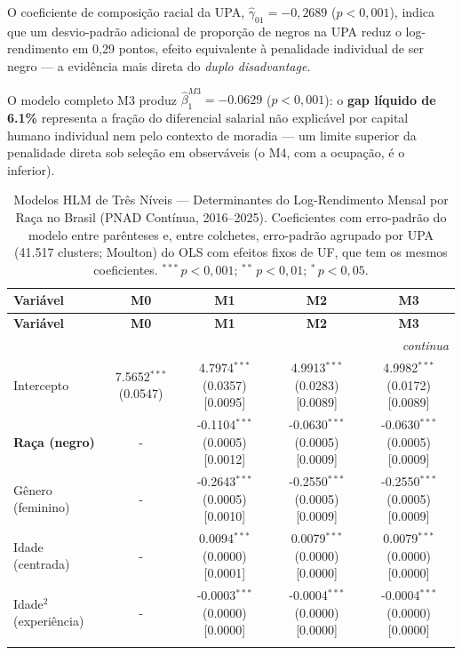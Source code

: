 \documentclass[12pt, a4paper, oneside]{article}
\begin{document}
O coeficiente de composição racial da UPA,
$\hat{\gamma}_{01} = -0{,}2689$ ($p<0{,}001$), indica que um desvio-padrão
adicional de proporção de negros na UPA reduz o log-rendimento em
0{,}29 pontos, efeito equivalente à penalidade individual de ser negro
--- a evidência mais direta do \textit{duplo disadvantage}.

O modelo completo M3 produz $\hat{\beta}_1^{M3} = -0.0629$
($p<0{,}001$): o \textbf{gap líquido de 6.1\%} representa a fração
do diferencial salarial não explicável por capital humano individual
nem pelo contexto de moradia --- um limite superior da penalidade
direta sob seleção em observáveis (o M4, com a ocupação, é o inferior).

\begin{longtable}{lcccc}
\caption{Modelos HLM de Três Níveis --- Determinantes do Log-Rendimento Mensal por Raça no Brasil (PNAD Contínua, 2016--2025). Coeficientes com erro-padrão do modelo entre parênteses e, entre colchetes, erro-padrão agrupado por UPA (41.517 clusters; Moulton) do OLS com efeitos fixos de UF, que tem os mesmos coeficientes. $^{***}$\,$p<0{,}001$; $^{**}$\,$p<0{,}01$; $^{*}$\,$p<0{,}05$.}\label{tab:hlm_resultados}\\
\toprule
\textbf{Variável} & \textbf{M0} & \textbf{M1} & \textbf{M2} & \textbf{M3} \\
\midrule \endfirsthead
\toprule
\textbf{Variável} & \textbf{M0} & \textbf{M1} & \textbf{M2} & \textbf{M3} \\
\midrule \endhead
\midrule \multicolumn{5}{r}{\textit{continua}} \\ \endfoot
\bottomrule \endlastfoot
Intercepto & 7.5652$^{***}$ (0.0547) & 4.7974$^{***}$ (0.0357) [0.0095] & 4.9913$^{***}$ (0.0283) [0.0089] & 4.9982$^{***}$ (0.0172) [0.0089] \\
\textbf{Raça (negro)} & - & -0.1104$^{***}$ (0.0005) [0.0012] & -0.0630$^{***}$ (0.0005) [0.0009] & -0.0630$^{***}$ (0.0005) [0.0009] \\
Gênero (feminino) & - & -0.2643$^{***}$ (0.0005) [0.0010] & -0.2550$^{***}$ (0.0005) [0.0009] & -0.2550$^{***}$ (0.0005) [0.0009] \\
Idade (centrada) & - & 0.0094$^{***}$ (0.0000) [0.0001] & 0.0079$^{***}$ (0.0000) [0.0000] & 0.0079$^{***}$ (0.0000) [0.0000] \\
Idade$^2$ (experiência) & - & -0.0003$^{***}$ (0.0000) [0.0000] & -0.0004$^{***}$ (0.0000) [0.0000] & -0.0004$^{***}$ (0.0000) [0.0000] \\
\addlinespace[3pt]
\multicolumn{5}{l}{\textit{Controles educacionais}} \\

\end{longtable}
\end{document}
